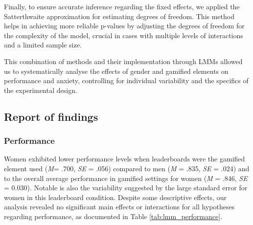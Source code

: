 Finally, to ensure accurate inference regarding the fixed effects, we applied the Satterthwaite approximation for estimating degrees of freedom.
This method helps in achieving more reliable p-values by adjusting the degrees of freedom for the complexity of the model, crucial in cases with multiple levels of interactions and a limited sample size.

This combination of methods and their implementation through LMMs allowed us to systematically analyse the effects of gender and gamified elements on performance and anxiety, controlling for individual variability and the specifics of the experimental design.

\subsection{Report of findings}

\subsubsection{Performance}
Women exhibited lower performance levels when leaderboards were the gamified element used (\textit{M}= .700, \textit{SE} = .056) compared to men (\textit{M} = .835, \textit{SE} = .024) and to the overall average performance in gamified settings for women (\textit{M} = .846, \textit{SE} = 0.030).
Notable is also the variability suggested by the large standard error for women in this leaderboard condition.
Despite some descriptive effects, our analysis revealed no significant main effects or interactions for all hypotheses regarding performance, as documented in Table \ref{tab:lmm_performance}.


